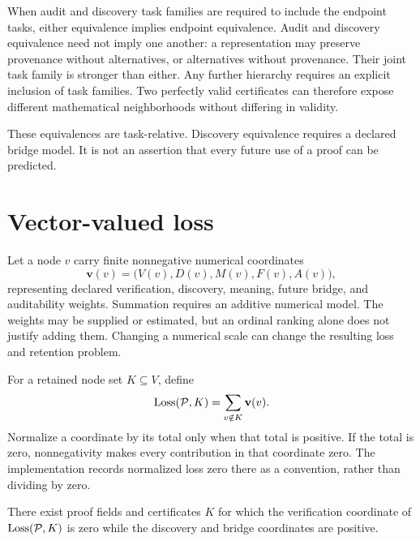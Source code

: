 When audit and discovery task families are required to include the endpoint tasks, either equivalence implies endpoint equivalence. Audit and discovery equivalence need not imply one another: a representation may preserve provenance without alternatives, or alternatives without provenance. Their joint task family is stronger than either. Any further hierarchy requires an explicit inclusion of task families. Two perfectly valid certificates can therefore expose different mathematical neighborhoods without differing in validity.

\begin{PPTremark}
\label{PPT:res:8:4}
These equivalences are task-relative. Discovery equivalence requires a declared bridge model. It is not an assertion that every future use of a proof can be predicted.
\end{PPTremark}


\section{Vector-valued loss}
\label{PPT:sec:old9}

Let a node $v$ carry finite nonnegative numerical coordinates
\[
\mathbf v(v)=
\bigl(V(v),D(v),M(v),F(v),A(v)\bigr),
\]
representing declared verification, discovery, meaning, future bridge, and auditability weights. Summation requires an additive numerical model. The weights may be supplied or estimated, but an ordinal ranking alone does not justify adding them. Changing a numerical scale can change the resulting loss and retention problem.

\begin{PPTdefinition}
\label{PPT:res:9:1}
For a retained node set $K\subseteq V$, define
\[
\operatorname{Loss}(\mathcal P,K)
=
\sum_{v\notin K}\mathbf v(v).
\]
Normalize a coordinate by its total only when that total is positive. If the total is zero, nonnegativity makes every contribution in that coordinate zero. The implementation records normalized loss zero there as a convention, rather than dividing by zero.
\end{PPTdefinition}

\begin{PPTproposition}
\label{PPT:res:9:2}
There exist proof fields and certificates $K$ for which the verification coordinate of $\operatorname{Loss}(\mathcal P,K)$ is zero while the discovery and bridge coordinates are positive.
\end{PPTproposition}

